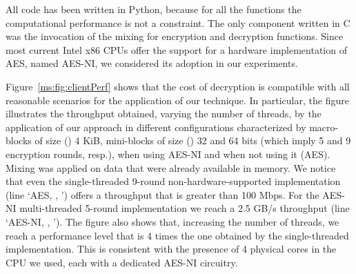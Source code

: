 All code has been written in Python, because for all the functions the computational performance is not a constraint. The only component written in C was the invocation of the mixing for encryption and decryption functions. Since most current Intel x86 CPUs offer the support for a hardware implementation of AES, named AES-NI, we considered its adoption in our experiments. 


Figure~\ref{ms:fig:clientPerf} shows that the cost of decryption is compatible with all reasonable scenarios for the application of our technique. In particular, the figure illustrates the throughput obtained, varying the number of threads, by the application of our approach in different configurations characterized by macro-blocks of size (\Msize) 4 KiB, mini-blocks of size (\msize) 32 and 64 bits (which imply 5 and 9 encryption rounds, resp.), when using AES-NI and when not using it (AES). Mixing was applied on data that were already available in memory. We notice that even the single-threaded 9-round non-hardware-supported implementation (line `AES, , ') offers a throughput that is greater than 100 Mbps. For the AES-NI multi-threaded 5-round implementation we reach a 2.5 GB/s throughput (line `AES-NI, , '). The figure also shows that, increasing the number of threads, we reach a performance level that is 4 times the one obtained by the single-threaded implementation. This is consistent with the presence of 4 physical cores in the CPU we used, each with a dedicated AES-NI circuitry.

